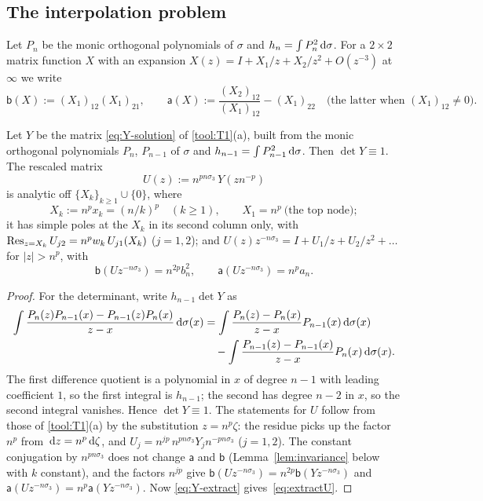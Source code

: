 \subsection{The interpolation problem}\label{sec:frame-interp}
Let $P_n$ be the monic orthogonal polynomials of $\sigma$ and $h_n=\int P_n^2\,\mathrm{d}\sigma$. For a $2\times2$ matrix
function $X$ with an expansion $X(z)=I+X_1/z+X_2/z^2+O(z^{-3})$ at $\infty$ we write
\begin{equation}\label{eq:functional-a}
  \mathsf b(X):=(X_1)_{12}(X_1)_{21},\qquad
  \mathsf a(X):=\frac{(X_2)_{12}}{(X_1)_{12}}-(X_1)_{22}\quad\text{(the latter when $(X_1)_{12}\ne0$).}
\end{equation}

\begin{lemma}\label{lem:interp}
Let $Y$ be the matrix \eqref{eq:Y-solution} of \ref{tool:T1}(a), built from the monic orthogonal polynomials $P_n$,
$P_{n-1}$ of $\sigma$ and $h_{n-1}=\int P_{n-1}^2\,\mathrm{d}\sigma$. Then $\det Y\equiv1$. The rescaled matrix
\begin{equation}\label{eq:U}
  U(z):=n^{pn\sigma_3}\,Y(zn^{-p})
\end{equation}
is analytic off $\{X_k\}_{k\ge1}\cup\{0\}$, where
\begin{equation}\label{eq:Xk}
  X_k:=n^px_k=(n/k)^p\quad(k\ge1),\qquad X_1=n^p\ \text{(the top node)};
\end{equation}
it has simple poles at the $X_k$ in its second column only, with $\operatorname*{Res}_{z=X_k}U_{j2}=n^pw_k\,U_{j1}(X_k)$ ($j=1,2$);
and $U(z)z^{-n\sigma_3}=I+U_1/z+U_2/z^2+\dots$ for $|z|>n^p$, with
\begin{equation}\label{eq:extractU}
  \mathsf b(Uz^{-n\sigma_3})=n^{2p}b_n^2,\qquad \mathsf a(Uz^{-n\sigma_3})=n^pa_n .
\end{equation}
\end{lemma}

\begin{proof}
For the determinant, write $h_{n-1}\det Y$ as
\begin{align*}
  \int\frac{P_n(z)P_{n-1}(x)-P_{n-1}(z)P_n(x)}{z-x}\,\mathrm{d}\sigma(x)
  &=\int\frac{P_n(z)-P_n(x)}{z-x}P_{n-1}(x)\,\mathrm{d}\sigma(x)\\
  &\quad-\int\frac{P_{n-1}(z)-P_{n-1}(x)}{z-x}P_n(x)\,\mathrm{d}\sigma(x).
\end{align*}
The first difference quotient is a polynomial in $x$ of degree $n-1$ with leading coefficient $1$, so the first
integral is $h_{n-1}$; the second has degree $n-2$ in $x$, so the second integral vanishes. Hence $\det Y\equiv1$.
The statements for $U$ follow from those of \ref{tool:T1}(a) by the substitution $z=n^p\zeta$: the residue picks up
the factor $n^p$ from $\,\mathrm{d} z=n^p\,\mathrm{d}\zeta$, and $U_j=n^{jp}\,n^{pn\sigma_3}Y_jn^{-pn\sigma_3}$ ($j=1,2$). The constant
conjugation by $n^{pn\sigma_3}$ does not change $\mathsf a$ and $\mathsf b$ (Lemma~\ref{lem:invariance} below with $k$
constant), and the factors $n^{jp}$ give $\mathsf b(Uz^{-n\sigma_3})=n^{2p}\mathsf b(Yz^{-n\sigma_3})$ and
$\mathsf a(Uz^{-n\sigma_3})=n^p\mathsf a(Yz^{-n\sigma_3})$. Now \eqref{eq:Y-extract} gives~\eqref{eq:extractU}.
\end{proof}

